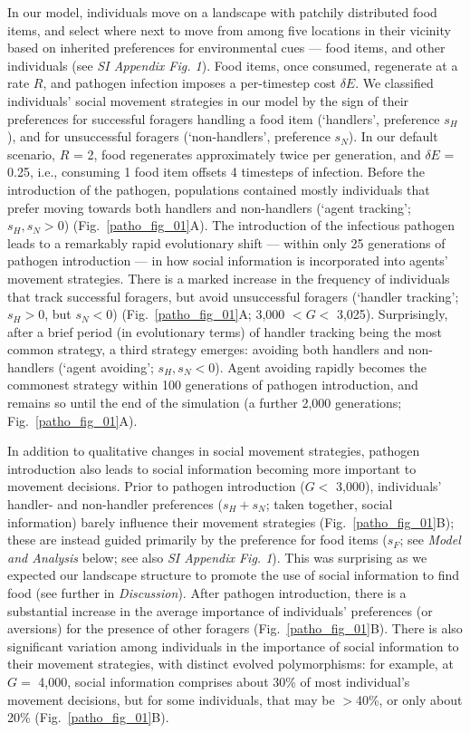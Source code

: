 In our model, individuals move on a landscape with patchily distributed food items, and select where next to move from among five locations in their vicinity based on inherited preferences for environmental cues --- food items, and other individuals (see \textit{SI Appendix Fig. 1}).
Food items, once consumed, regenerate at a rate $R$, and pathogen infection imposes a per-timestep cost $\delta E$.
We classified individuals' social movement strategies in our model by the sign of their preferences for successful foragers handling a food item (`handlers', preference $s_H$), and for unsuccessful foragers (`non-handlers', preference $s_N$).
In our default scenario, $R$ = 2, food regenerates approximately twice per generation, and $\delta E$ = 0.25, i.e., consuming 1 food item offsets 4 timesteps of infection. 
Before the introduction of the pathogen, populations contained mostly individuals that prefer moving towards both handlers and non-handlers (`agent tracking'; $s_H, s_N > 0$) (Fig.~\ref{patho_fig_01}A).
The introduction of the infectious pathogen leads to a remarkably rapid evolutionary shift --- within only 25 generations of pathogen introduction --- in how social information is incorporated into agents' movement strategies.
There is a marked increase in the frequency of individuals that track successful foragers, but avoid unsuccessful foragers (`handler tracking'; $s_H > 0$, but $s_N < 0$) (Fig.~\ref{patho_fig_01}A; 3,000 $< G <$ 3,025).
Surprisingly, after a brief period (in evolutionary terms) of handler tracking being the most common strategy, a third strategy emerges: avoiding both handlers and non-handlers (`agent avoiding'; $s_H, s_N < 0$).
Agent avoiding rapidly becomes the commonest strategy within 100 generations of pathogen introduction, and remains so until the end of the simulation (a further 2,000 generations; Fig.~\ref{patho_fig_01}A).

In addition to qualitative changes in social movement strategies, pathogen introduction also leads to social information becoming more important to movement decisions.
Prior to pathogen introduction ($G <$ 3,000), individuals' handler- and non-handler preferences ($s_H + s_N$; taken together, social information) barely influence their movement strategies (Fig.~\ref{patho_fig_01}B); these are instead guided primarily by the preference for food items ($s_F$; see \textit{Model and Analysis} below; see also \textit{SI Appendix Fig. 1}).
This was surprising as we expected our landscape structure to promote the use of social information to find food (see further in \textit{Discussion}).
After pathogen introduction, there is a substantial increase in the average importance of individuals' preferences (or aversions) for the presence of other foragers (Fig.~\ref{patho_fig_01}B).
There is also significant variation among individuals in the importance of social information to their movement strategies, with distinct evolved polymorphisms: for example, at $G =$ 4,000, social information comprises about 30\% of most individual's movement decisions, but for some individuals, that may be $>$40\%, or only about 20\% (Fig.~\ref{patho_fig_01}B).

